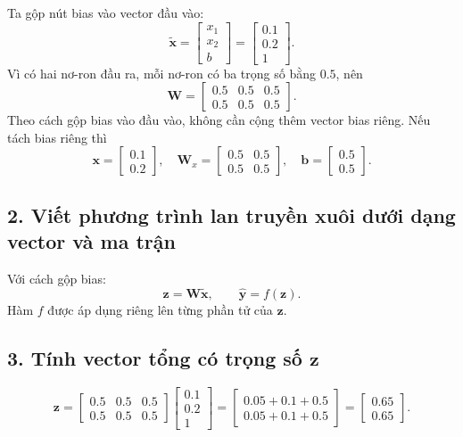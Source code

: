 \documentclass[12pt,a4paper]{article}
\begin{document}
 Ta gộp nút bias vào vector đầu vào:
\[
\tilde{\mathbf x}=\begin{bmatrix}x_1\\x_2\\b\end{bmatrix}
=\begin{bmatrix}0.1\\0.2\\1\end{bmatrix}.
\]
Vì có hai nơ-ron đầu ra, mỗi nơ-ron có ba trọng số bằng $0.5$, nên
\[
\mathbf W=
\begin{bmatrix}
0.5&0.5&0.5\\
0.5&0.5&0.5
\end{bmatrix}.
\]
Theo cách gộp bias vào đầu vào, không cần cộng thêm vector bias riêng. Nếu tách bias riêng thì
\[
\mathbf x=\begin{bmatrix}0.1\\0.2\end{bmatrix},\quad
\mathbf W_x=\begin{bmatrix}0.5&0.5\\0.5&0.5\end{bmatrix},\quad
\mathbf b=\begin{bmatrix}0.5\\0.5\end{bmatrix}.
\]

\subsection*{2. Viết phương trình lan truyền xuôi dưới dạng vector và ma trận}

 Với cách gộp bias:
\[
\mathbf z=\mathbf W\tilde{\mathbf x},\qquad
\hat{\mathbf y}=f(\mathbf z).
\]
Hàm $f$ được áp dụng riêng lên từng phần tử của $\mathbf z$.

\subsection*{3. Tính vector tổng có trọng số $\mathbf z$}


\[
\mathbf z=
\begin{bmatrix}
0.5&0.5&0.5\\
0.5&0.5&0.5
\end{bmatrix}
\begin{bmatrix}0.1\\0.2\\1\end{bmatrix}
=
\begin{bmatrix}0.05+0.1+0.5\\0.05+0.1+0.5\end{bmatrix}
=\begin{bmatrix}0.65\\0.65\end{bmatrix}.
\]
\end{document}
